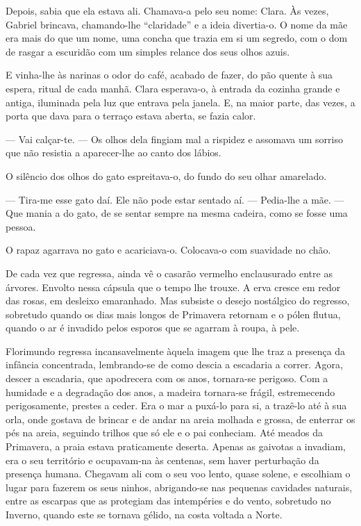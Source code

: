 Depois, sabia que ela estava ali. Chamava-a pelo seu nome: Clara. Às
vezes, Gabriel brincava, chamando-lhe ``claridade'' e a ideia
divertia-o. O nome da mãe era mais do que um nome, uma concha que trazia
em si um segredo, com o dom de rasgar a escuridão com um simples relance
dos seus olhos azuis.

E vinha-lhe às narinas o odor do café, acabado de fazer, do pão quente à
sua espera, ritual de cada manhã. Clara esperava-o, à entrada da cozinha
grande e antiga, iluminada pela luz que entrava pela janela. E, na maior
parte, das vezes, a porta que dava para o terraço estava aberta, se
fazia calor.

--- Vai calçar-te. --- Os olhos dela fingiam mal a rispidez e assomava um
sorriso que não resistia a aparecer-lhe ao canto dos lábios.

O silêncio dos olhos do gato espreitava-o, do fundo do seu olhar
amarelado.

--- Tira-me esse gato daí. Ele não pode estar sentado aí. --- Pedia-lhe a
mãe. --- Que mania a do gato, de se sentar sempre na mesma cadeira, como
se fosse uma pessoa.

O rapaz agarrava no gato e acariciava-o. Colocava-o com suavidade no
chão.

De cada vez que regressa, ainda vê o casarão vermelho enclausurado entre
as árvores. Envolto nessa cápsula que o tempo lhe trouxe. A erva cresce
em redor das rosas, em desleixo emaranhado. Mas subsiste o desejo
nostálgico do regresso, sobretudo quando os dias mais longos de
Primavera retornam e o pólen flutua, quando o ar é invadido pelos
esporos que se agarram à roupa, à pele.

Florimundo regressa incansavelmente àquela imagem que lhe traz a
presença da infância concentrada, lembrando-se de como descia a
escadaria a correr. Agora, descer a escadaria, que apodrecera com os
anos, tornara-se perigoso. Com a humidade e a degradação dos anos, a
madeira tornara-se frágil, estremecendo perigosamente, prestes a ceder.
Era o mar a puxá-lo para si, a trazê-lo até à sua orla, onde gostava de
brincar e de andar na areia molhada e grossa, de enterrar os pés na
areia, seguindo trilhos que só ele e o pai conheciam. Até meados da
Primavera, a praia estava praticamente deserta. Apenas as gaivotas a
invadiam, era o seu território e ocupavam-na às centenas, sem haver
perturbação da presença humana. Chegavam ali com o seu voo lento, quase
solene, e escolhiam o lugar para fazerem os seus ninhos, abrigando-se
nas pequenas cavidades naturais, entre as escarpas que as protegiam das
intempéries e do vento, sobretudo no Inverno, quando este se tornava
gélido, na costa voltada a Norte.

